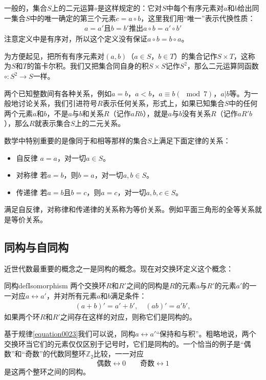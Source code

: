 一般的，集合$S$上的二元运算$\circ$是这样规定的：它对$S$中每个有序元素对$a$和$b$给出同一集合$S$中的唯一确定的第三个元素$c=a \circ b$，这里我们用“唯一”表示代换性质：
\begin{gather}\label{equation0022}
a=a'\text{且}b=b'\text{推出}a \circ b = a' \circ b'
\end{gather}
注意定义中是有序对，所以这个定义没有保证$a \circ b = b \circ a$。

为方便起见，把所有有序元素对$(a, b)$（$a \in S$，$b \in T$）的集合记作$S \times T$，这称为$S$和$T$的笛卡尔积。我们又把集合同自身的积$S \times S$记作$S^2$，那么二元运算同函数$\circ: S^2 \to S$一样。

两个已知整数间有各种关系，例如$a=b$，$a<b$，$a \equiv b(\mod{7})$，$a|b$等。为一般地讨论关系，我们引进符号$R$表示任何关系，形式上，如果已知集合$S$中的任何两个元素$a$和$b$，不是$a$与$b$和关系$R$（记作$aRb$），就是$a$与$b$没有关系$R$（记作$aR'b$），那么$R$就表示集合$S$上的二元关系。

数学中特别重要的是像同于和相等那样的集合$S$上满足下面定律的关系：
\begin{itemize}
\item 自反律 $a=a$，对一切$a \in S$。
\item 对称律 若$a=b$，则$b=a$，对一切$a, b \in S$。
\item 传递律 若$a=b$且$b=c$，则$a=c$，对一切$a, b, c \in S$。
\end{itemize}
满足自反律，对称律和传递律的关系称为等价关系。例如平面三角形的全等关系就是等价关系。


\subsection{同构与自同构}\label{subsection0010112}
近世代数最重要的概念之一是同构的概念。现在对交换环定义这个概念：
\begin{definition}{同构}{defIsomorphism}
两个交换环$R$和$R'$之间的同构是$R$的元素a与$R'$的元素$a'$的一一对应$a \leftrightarrow a'$，并对所有元素$a$和$b$满足条件：
\begin{gather}\label{equation0023}
(a+b)'=a'+b',\quad (ab)'=a'b',
\end{gather}
如果两个环$R$和$R'$之间存在这样的对应，则称它们是同构的。
\end{definition}
基于规律\ref{equation0023}我们可以说，同构$a \leftrightarrow a'$“保持和与积”。粗略地说，两个交换环当它们的元素仅仅区别于记号时，它们是同构的。一个恰当的例子是“偶数”和“奇数”的代数同整环$\mathbb{Z}_2$比较，一一对应
\[
\text{偶数}\leftrightarrow 0 \quad\quad \text{奇数}\leftrightarrow 1
\]
是这两个整环之间的同构。

